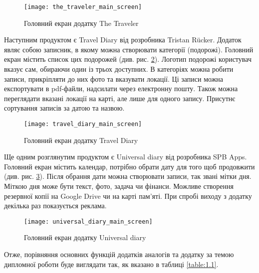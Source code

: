 \documentclass[../main.tex]{subfiles}
\begin{document}
\begin{figure}[H]
	\centering
	\texttt{[image: the\_traveler\_main\_screen]}
	\caption{Головний екран додатку The Traveler}
	\label{figure:1.2}
\end{figure}

Наступним продуктом є Travel Diary від розробника Tristan Rücker. Додаток являє собою записник, в якому можна створювати категорії (подорожі). Головний екран містить список цих подорожей (див. рис. \ref{figure:1.3}). Логотип подорожі користувач вказує сам, обираючи один із трьох доступних. В категоріях можна робити записи, прикріпляти до них фото та вказувати локації. Ці записи можна експортувати в pdf-файли, надсилати через електронну пошту. Також можна переглядати вказані локації на карті, але лише для одного запису. Присутнє сортування записів за датою та назвою.

\begin{figure}[H]
\centering
\texttt{[image: travel\_diary\_main\_screen]}
\caption{Головний екран додатку Travel Diary}
\label{figure:1.3}
\end{figure}

Ще одним розглянутим продуктом є Universal diary від розробника SPB Apps. Головний екран містить календар, потрібно обрати дату для того щоб продовжити (див. рис. \ref{figure:1.4}). Після обрання дати можна створювати записи, так звані мітки дня. Міткою дня може бути текст, фото, задача чи фінанси. Можливе створення резервної копії на Google Drive чи на карті пам'яті. При спробі виходу з додатку декілька раз показується реклама.

\begin{figure}[H]
\centering
\texttt{[image: universal\_diary\_main\_screen]}
\caption{Головний екран додатку Universal diary}
\label{figure:1.4}
\end{figure}

Отже, порівняння основних функцій додатків аналогів та додатку за темою дипломної роботи буде виглядати так, як вказано в таблиці \ref{table:1.1}.
\end{document}

